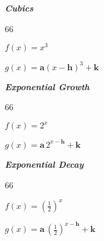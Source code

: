 {
    \begin{minipage}{0.25\textwidth}
        \vspace{-1.25\onelineskip}
        \begin{center}
            {\bfseries\itshape Cubics}\\
            \begin{myTikzpictureGrid}{0.25} {6}{6}
            \end{myTikzpictureGrid}
        \end{center}\vspace{-1\onelineskip}
        {$f(x) = x^3$}

        {$g(x) = \bm{a} (x-\bm{h})^3 + \bm{k}$}
    \end{minipage}
}
\hfill 
{
    \begin{minipage}{0.25\textwidth}
        \vspace{-1.25\onelineskip}
        \begin{center}
            {\bfseries\itshape Exponential Growth}\\
            \begin{myTikzpictureGrid}{0.25} {6}{6}
            \end{myTikzpictureGrid}
        \end{center}\vspace{-1\onelineskip}
        {$f(x) = 2^x$}

        {$g(x) = \bm{a}\,2^{x-\bm{h}} + \bm{k}$}
    \end{minipage}
}
\hfill 
{
    \begin{minipage}{0.25\textwidth}
        \begin{center}
            {\bfseries\itshape Exponential Decay}\\
            \begin{myTikzpictureGrid}{0.25} {6}{6}
            \end{myTikzpictureGrid}
        \end{center}\vspace{-0.5\onelineskip}
        {$f(x) = \left(\frac{1}{2}\right)^x$}

        {$g(x) = \bm{a}\,\left(\frac{1}{2}\right)^{x-\bm{h}} + \bm{k}$}
    \end{minipage}
}
\vfil



